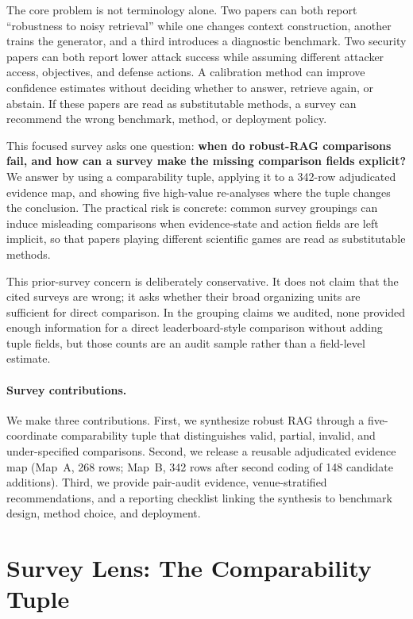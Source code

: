 \documentclass[runningheads]{llncs}
\begin{document}
The core problem is not terminology alone. Two papers can both report ``robustness to noisy retrieval'' while one changes context construction, another trains the generator, and a third introduces a diagnostic benchmark. Two security papers can both report lower attack success while assuming different attacker access, objectives, and defense actions. A calibration method can improve confidence estimates without deciding whether to answer, retrieve again, or abstain. If these papers are read as substitutable methods, a survey can recommend the wrong benchmark, method, or deployment policy.

This focused survey asks one question: \textbf{when do robust-RAG comparisons fail, and how can a survey make the missing comparison fields explicit?} We answer by using a comparability tuple, applying it to a 342-row adjudicated evidence map, and showing five high-value re-analyses where the tuple changes the conclusion. The practical risk is concrete: common survey groupings can induce misleading comparisons when evidence-state and action fields are left implicit, so that papers playing different scientific games are read as substitutable methods.

This prior-survey concern is deliberately conservative. It does not claim that the cited surveys are wrong; it asks whether their broad organizing units are sufficient for direct comparison. In the grouping claims we audited, none provided enough information for a direct leaderboard-style comparison without adding tuple fields, but those counts are an audit sample rather than a field-level estimate.

\paragraph{Survey contributions.}
We make three contributions. First, we synthesize robust RAG through a five-coordinate comparability tuple that distinguishes valid, partial, invalid, and under-specified comparisons. Second, we release a reusable adjudicated evidence map (Map~A, 268 rows; Map~B, 342 rows after second coding of 148 candidate additions). Third, we provide pair-audit evidence, venue-stratified recommendations, and a reporting checklist linking the synthesis to benchmark design, method choice, and deployment.

\section{Survey Lens: The Comparability Tuple}
\label{sec:framework-first}
\end{document}
